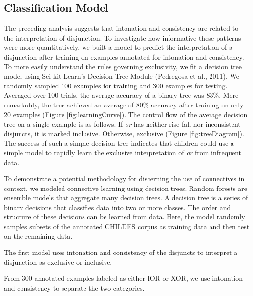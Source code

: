 \documentclass[oneside]{report}
\theoremstyle{definition}
\theoremstyle{definition}
\theoremstyle{definition}
\theoremstyle{remark}
\begin{document}
\subsection{Classification Model}\label{classification-model}

The preceding analysis suggests that intonation and consistency are
related to the interpretation of disjunction. To investigate how
informative these patterns were more quantitatively, we built a model to
predict the interpretation of a disjunction after training on examples
annotated for intonation and consistency. To more easily understand the
rules governing exclusivity, we fit a decision tree model using Sci-kit
Learn's Decision Tree Module (Pedregosa et al., 2011). We randomly
sampled 100 examples for training and 300 examples for testing. Averaged
over 100 trials, the average accuracy of a binary tree was 83\%. More
remarkably, the tree achieved an average of 80\% accuracy after training
on only 20 examples (Figure \ref{fig:learningCurve}). The control flow
of the average decision tree on a single example is as follows. If
\emph{or} has neither rise-fall nor inconsistent disjuncts, it is marked
inclusive. Otherwise, exclusive (Figure \ref{fig:treeDiagram}). The
success of such a simple decision-tree indicates that children could use
a simple model to rapidly learn the exclusive interpretation of
\emph{or} from infrequent data.

To demonstrate a potential methodology for discerning the use of
connectives in context, we modeled connective learning using decision
trees. Random forests are ensemble models that aggregate many decision
trees. A decision tree is a series of binary decisions that classifies
data into two or more classes. The order and structure of these
decisions can be learned from data. Here, the model randomly samples
subsets of the annotated CHILDES corpus as training data and then test
on the remaining data.

The first model uses intonation and consistency of the disjuncts to
interpret a disjunction as exclusive or inclusive.

From 300 annotated examples labeled as either IOR or XOR, we use
intonation and consistency to separate the two categories. \newline
\end{document}
